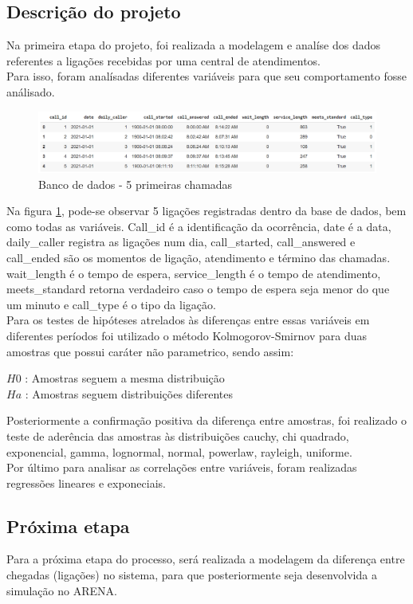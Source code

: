 \subsection{Descrição do projeto}
Na primeira etapa do projeto, foi realizada a modelagem e analíse dos dados referentes a ligações recebidas por uma central de atendimentos.\\
Para isso, foram analísadas diferentes variáveis para que seu comportamento fosse análisado.\\
\begin{figure}[ht]
    \includegraphics[scale= 0.6]{introducao/imgintro.png}
    \caption{Banco de dados - 5 primeiras chamadas}
    \label{fig: bd_img}
\end{figure}
Na figura \ref*{fig: bd_img}, pode-se observar 5 ligações registradas dentro da base de dados, bem como todas as variáveis. Call\_id é a identificação da ocorrência, date é a data, daily\_caller registra as ligações num dia, call\_started, call\_answered e call\_ended são os momentos de ligação, atendimento e término das chamadas. 
wait\_length é o tempo de espera,  service\_length é o tempo de atendimento, meets\_standard retorna verdadeiro caso o tempo de espera seja menor do que um minuto e call\_type é o tipo da ligação.\\
Para os testes de hipóteses atrelados às diferenças entre essas variáveis em diferentes períodos foi utilizado o método Kolmogorov-Smirnov para duas amostras que possui caráter não parametrico, sendo assim:\\
\begin{center}
$H{0}$ : Amostras seguem a mesma distribuição\\
$H{a}$ : Amostras seguem distribuições diferentes
\end{center}
Posteriormente a confirmação positiva da diferença entre amostras, foi realizado o teste de aderência das amostras às distribuições cauchy, chi quadrado, exponencial, gamma, lognormal, normal, powerlaw, rayleigh, uniforme.\\
Por último para analisar as correlações entre variáveis, foram realizadas regressões lineares e exponeciais.\\

\subsection{Próxima etapa}
Para a próxima etapa do processo, será realizada a modelagem da diferença entre chegadas (ligações) no sistema, para que posteriormente seja desenvolvida a simulação no ARENA.


